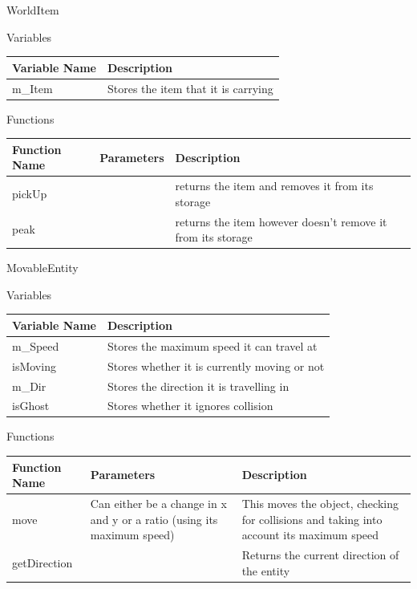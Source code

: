 \documentclass[../../Main.tex]{subfiles}
\begin{document}
    WorldItem
    \begin{center}
        Variables
        \begin{tabular}{ | m{} | m{} | }
            \hline
            \textbf{Variable Name} & \textbf{Description} \\
            \hline
            m\_Item & Stores the item that it is carrying \\
            \hline
        \end{tabular}
        Functions
        \begin{tabular}{ | m{} | m{}| m{} | }
            \hline
            \textbf{Function Name} & \textbf{Parameters} & \textbf{Description} \\
            \hline
            pickUp & & returns the item and removes it from its storage \\
            \hline
            peak & & returns the item however doesn't remove it from its storage \\
            \hline
        \end{tabular}
    \end{center}
    MovableEntity
    \begin{center}
        Variables
        \begin{tabular}{ | m{} | m{} | }
            \hline
            \textbf{Variable Name} & \textbf{Description} \\
            \hline
            m\_Speed & Stores the maximum speed it can travel at \\
            \hline
            isMoving & Stores whether it is currently moving or not \\
            \hline
            m\_Dir & Stores the direction it is travelling in \\
            \hline
            isGhost & Stores whether it ignores collision \\
            \hline
        \end{tabular}
        Functions
        \begin{tabular}{ | m{} | m{}| m{} | }
            \hline
            \textbf{Function Name} & \textbf{Parameters} & \textbf{Description} \\
            \hline
            move & Can either be a change in x and y or a ratio (using its maximum speed) & This moves the object, checking for collisions and taking into account its maximum speed \\
            \hline
            getDirection & & Returns the current direction of the entity \\
            \hline
        \end{tabular}
    \end{center}
\end{document}
